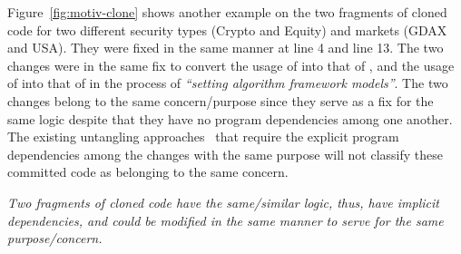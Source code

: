 Figure~\ref{fig:motiv-clone} shows another example on the two
fragments of cloned code for two different security types (Crypto and
Equity) and markets (GDAX and USA). They were fixed in the same manner
at line 4 and line 13. The two changes were in the same fix to convert
the usage of  into that of
, and the usage of
 into that of
 in the process of {\em ``setting
  algorithm framework models''}. The two changes belong to the same
concern/purpose since they serve as a fix for the same logic despite
that they have no program dependencies among one another. The existing
untangling
approaches~\cite{flexeme-fse20,smartcommit-fse21,roover-scam18,barnett-icse15}
that require the explicit program dependencies among the changes with
the same purpose will not classify these committed code as belonging
to the same concern.

 {\em Two
  fragments of cloned code have the same/similar logic, thus, have
  implicit dependencies, and could be modified in the same manner to
  serve for the same purpose/concern.}




